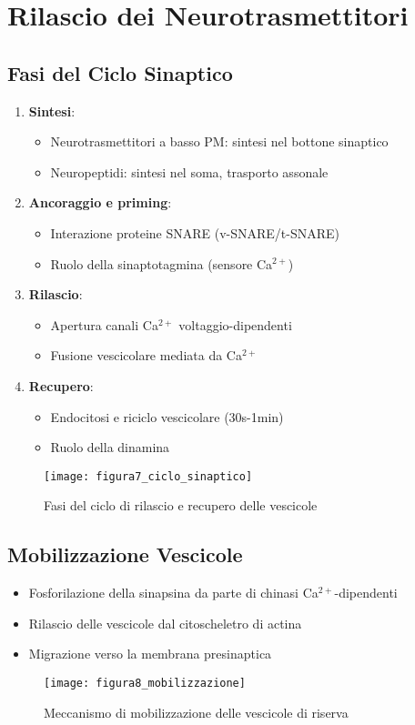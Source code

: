 \documentclass{article}
\begin{document}
\section{Rilascio dei Neurotrasmettitori}
\subsection{Fasi del Ciclo Sinaptico}
\begin{enumerate}
\item \textbf{Sintesi}:
  \begin{itemize}
  \item Neurotrasmettitori a basso PM: sintesi nel bottone sinaptico
  \item Neuropeptidi: sintesi nel soma, trasporto assonale
  \end{itemize}
  
\item \textbf{Ancoraggio e priming}: 
  \begin{itemize}
  \item Interazione proteine SNARE (v-SNARE/t-SNARE)
  \item Ruolo della sinaptotagmina (sensore Ca$^{2+}$)
  \end{itemize}

\item \textbf{Rilascio}:
  \begin{itemize}
  \item Apertura canali Ca$^{2+}$ voltaggio-dipendenti
  \item Fusione vescicolare mediata da Ca$^{2+}$
  \end{itemize}

\item \textbf{Recupero}:
  \begin{itemize}
  \item Endocitosi e riciclo vescicolare (30s-1min)
  \item Ruolo della dinamina
  \end{itemize}
\end{enumerate}

\begin{figure}[h]
\centering
\texttt{[image: figura7\_ciclo\_sinaptico]}
\caption{Fasi del ciclo di rilascio e recupero delle vescicole}
\label{fig:ciclo}
\end{figure}

\subsection{Mobilizzazione Vescicole}
\begin{itemize}
\item Fosforilazione della sinapsina da parte di chinasi Ca$^{2+}$-dipendenti
\item Rilascio delle vescicole dal citoscheletro di actina
\item Migrazione verso la membrana presinaptica
\end{itemize}

\begin{figure}[h]
\centering
\texttt{[image: figura8\_mobilizzazione]}
\caption{Meccanismo di mobilizzazione delle vescicole di riserva}
\label{fig:mobilizzazione}
\end{figure}
\end{document}
